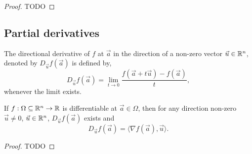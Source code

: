 \begin{proof}
	TODO
\end{proof}

\subsection{Partial derivatives}

\begin{defn}
	The directional derivative of $f$ at $\vec{a}$ in the direction
	of a non-zero vector $\vec{u} \in \mathbb{R}^n$, denoted by
	$D_{\vec{u}} f(\vec{a})$ is defined by,
	\[
		D_{\vec{u}} f(\vec{a}) = \lim_{t \to 0}
		\frac{f(\vec{a} + t \vec{u}) - f(\vec{a})}{t},
	\]
	whenever the limit exists.
\end{defn}

\begin{thm}
	If $f: \Omega \subseteq \mathbb{R}^n \to \mathbb{R}$ is differentiable at
	$\vec{a} \in \Omega$, then for any direction non-zero
	$\vec{u} \neq 0$, $\vec{u} \in \mathbb{R}^n$,
	$D_{\vec{u}} f(\vec{a})$ exists and
	\[
		D_{\vec{u}} f(\vec{a}) =
		\langle \nabla f(\vec{a}), \vec{u} \rangle .
	\]
\end{thm}

\begin{proof}
	TODO
\end{proof}

